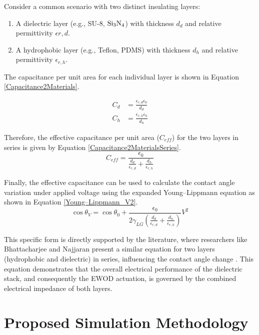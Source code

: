 \documentclass[9pt,a4paper,twocolumn,twoside]{tau-class/tau}
\begin{document}
Consider a common scenario with two distinct insulating layers:
\begin{enumerate}
    \item  A dielectric layer (e.g., SU-8, \(\ce{Si3N4}\)) with thickness $d_d$ and relative permittivity $\epsilon{r,d}$.
    \item A hydrophobic layer (e.g., Teflon, PDMS) with thickness $d_h$ and relative permittivity $\epsilon_{r,h}$.
\end{enumerate}

The capacitance per unit area for each individual layer is shown in Equation \ref{Capacitance2Materials}.

\begin{equation}
\begin{aligned}
\label{Capacitance2Materials}
C_{d} &= \frac{\epsilon_{r,d}\epsilon_{0}}{d_d} \\
C_{h} &= \frac{\epsilon_{r,h}\epsilon_{0}}{d_h}
\end{aligned}
\end{equation}

Therefore, the effective capacitance per unit area ($C_{eff}$) for the two layers in series is given by Equation \ref{Capacitance2MaterialsSeries}.
\begin{equation}
\label{Capacitance2MaterialsSeries}
 C_{eff} = \frac{\epsilon_0}{\frac{d_d}{\epsilon_{r,d}} + \frac{d_h}{\epsilon_{r,h}}}
\end{equation}

Finally, the effective capacitance can be used to calculate the contact angle variation under applied voltage using the expanded Young–Lippmann equation as shown in Equation \ref{Young–Lippmann_V2}.
\begin{equation}
\label{Young–Lippmann_V2}
\cos \theta_{V} = \cos \theta_{0} + \frac{\epsilon_{0}}{2\gamma_{LG} \left(\frac{d_{d}}{\epsilon_{r,d}} + \frac{d_{h}}{\epsilon_{r,h}}\right)} V^{2}
\end{equation}

This specific form is directly supported by the literature, where researchers like Bhattacharjee and Najjaran present a similar equation for two layers (hydrophobic and dielectric) in series, influencing the contact angle change \cite{bhattacharjeeDropletPositionControl2010}. This equation demonstrates that the overall electrical performance of the dielectric stack, and consequently the EWOD actuation, is governed by the combined electrical impedance of both layers.

\section{Proposed Simulation Methodology}
\end{document}
